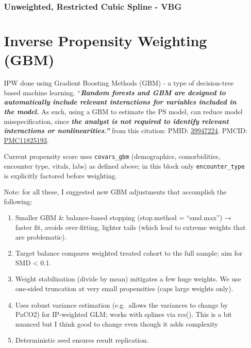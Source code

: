 \documentclass[
  11pt,
  letterpaper,
  DIV=11,
  numbers=noendperiod]{scrartcl}
\begin{document}
\subsubsection{Unweighted, Restricted Cubic Spline -
VBG}\label{unweighted-restricted-cubic-spline---vbg}

\FloatBarrier\nopagebreak

\par

\noindent

\section{Inverse Propensity Weighting
(GBM)}\label{inverse-propensity-weighting-gbm}

IPW done using Gradient Boosting Methods (GBM) - a type of decision-tree
based machine learning. ``\textbf{\emph{Random forests and GBM are
designed to automatically include relevant interactions for variables
included in the model.}} As such, using a GBM to estimate the PS model,
can reduce model misspecification, since \textbf{\emph{the analyst is
not required to identify relevant interactions or nonlinearities.''}}
from this citation: PMID:
\href{https://pubmed.ncbi.nlm.nih.gov/39947224/}{39947224}. PMCID:
\href{https://pmc.ncbi.nlm.nih.gov/articles/PMC11825193/}{PMC11825193}.

Current propensity score uses \texttt{covars\_gbm} (demographics,
comorbidities, encounter type, vitals, labs) as defined above; in this
block only \texttt{encounter\_type} is explicitly factored before
weighting.

Note: for all these, I suggested new GBM adjustments that accomplish the
following:

\begin{enumerate}
\def\labelenumi{\arabic{enumi}.}
\item
  Smaller GBM \& balance‑based stopping (stop.method = ``smd.max'') →
  faster fit, avoids over‑fitting, lighter tails (which lead to extreme
  weights that are problematic).
\item
  Target balance compares weighted treated cohort to the full sample;
  aim for \textbar SMD\textbar{} \textless{} 0.1.
\item
  Weight stabilization (divide by mean) mitigates a few huge weights. We
  use one‑sided truncation at very small propensities (caps large
  weights only).
\item
  Uses robust variance estimation (e.g.~allows the variances to change
  by PaCO2) for IP‑weighted GLM; works with splines via rcs(). This is a
  bit nuanced but I think good to change even though it adds complexity
\item
  Deterministic seed ensures result replication.
\end{enumerate}
\end{document}
